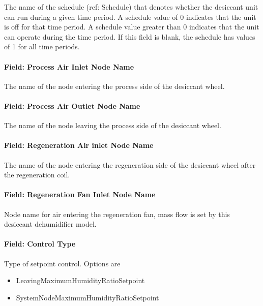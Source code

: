 The name of the schedule (ref: Schedule) that denotes whether the desiccant unit can run during a given time period. A schedule value of 0 indicates that the unit is off for that time period. A schedule value greater than 0 indicates that the unit can operate during the time period. If this field is blank, the schedule has values of 1 for all time periods.

\paragraph{Field: Process Air Inlet Node Name}\label{field-process-air-inlet-node-name}

The name of the node entering the process side of the desiccant wheel.

\paragraph{Field: Process Air Outlet Node Name}\label{field-process-air-outlet-node-name}

The name of the node leaving the process side of the desiccant wheel.

\paragraph{Field: Regeneration Air inlet Node Name}\label{field-regeneration-air-inlet-node-name}

The name of the node entering the regeneration side of the desiccant wheel after the regeneration coil.

\paragraph{Field: Regeneration Fan Inlet Node Name}\label{field-regeneration-fan-inlet-node-name}

Node name for air entering the regeneration fan, mass flow is set by this desiccant dehumidifier model.

\paragraph{Field: Control Type}\label{field-control-type-000}

Type of setpoint control. Options are

\begin{itemize}
\item
  LeavingMaximumHumidityRatioSetpoint
\item
  SystemNodeMaximumHumidityRatioSetpoint
\end{itemize}

